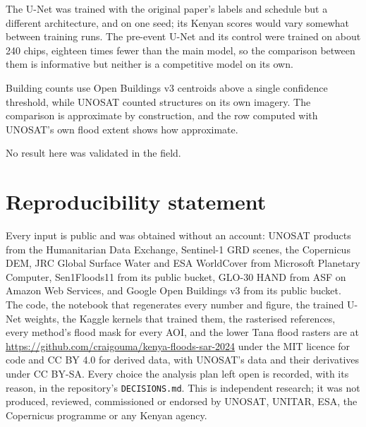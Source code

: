 \documentclass[11pt]{article}
\begin{document}
The U-Net was trained with the original paper's labels and schedule but a
different architecture, and on one seed; its Kenyan scores would vary
somewhat between training runs. The pre-event U-Net and its control were
trained on about 240 chips, eighteen times fewer than the main model, so the
comparison between them is informative but neither is a competitive model on
its own.

Building counts use Open Buildings v3 centroids above a single confidence
threshold, while UNOSAT counted structures on its own imagery. The comparison
is approximate by construction, and the row computed with UNOSAT's own flood
extent shows how approximate.

No result here was validated in the field.

\section*{Reproducibility statement}

Every input is public and was obtained without an account: UNOSAT products
from the Humanitarian Data Exchange, Sentinel-1 GRD scenes, the Copernicus
DEM, JRC Global Surface Water and ESA WorldCover from Microsoft Planetary
Computer, Sen1Floods11 from its public bucket, GLO-30 HAND from ASF on Amazon
Web Services, and Google Open Buildings v3 from its public bucket. The code,
the notebook that regenerates every number and figure, the trained U-Net
weights, the Kaggle kernels that trained them, the rasterised references,
every method's flood mask for every AOI, and the lower Tana flood rasters are
at \url{https://github.com/craigouma/kenya-floods-sar-2024} under the MIT
licence for code and CC BY 4.0 for derived data, with UNOSAT's data and their
derivatives under CC BY-SA. Every choice the analysis plan left open is
recorded, with its reason, in the repository's \texttt{DECISIONS.md}. This is
independent research; it was not produced, reviewed, commissioned or endorsed
by UNOSAT, UNITAR, ESA, the Copernicus programme or any Kenyan agency.
\end{document}
